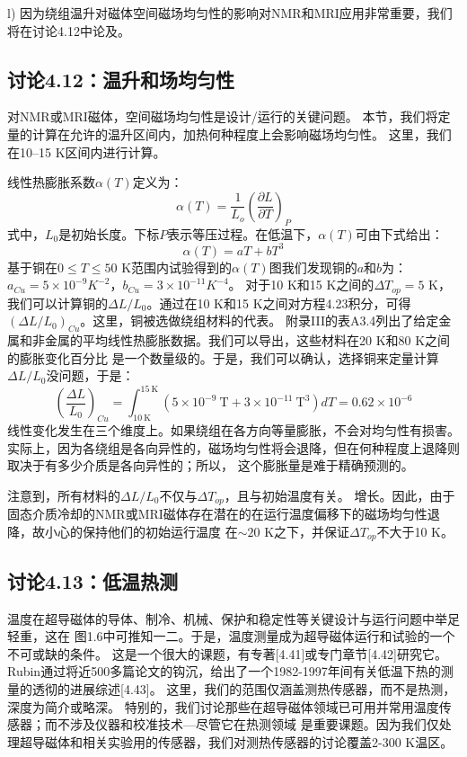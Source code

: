 l) 因为绕组温升对磁体空间磁场均匀性的影响对NMR和MRI应用非常重要，我们将在讨论4.12中论及。



\subsection{讨论4.12：温升和场均匀性}
对NMR或MRI磁体，空间磁场均匀性是设计/运行的关键问题。
本节，我们将定量的计算在允许的温升区间内，加热何种程度上会影响磁场均匀性。
这里，我们在10–15 K区间内进行计算。

线性热膨胀系数$\alpha(T)$定义为：
\begin{equation}%
\alpha(T)=\frac{1}{L_o}\left(\frac{\partial L}{\partial T}\right)_P
\end{equation}
式中，$L_0$是初始长度。下标$P$表示等压过程。在低温下，$\alpha(T)$可由下式给出：
\begin{equation}%
\alpha(T)=aT+bT^3
\end{equation}
基于铜在$0\le T\le 50$ K范围内试验得到的$\alpha(T)$图我们发现铜的$a$和$b$为：
$a_{Cu}= 5\times 10^{-9} K^{−2}$，$b_{Cu} = 3\times 10^{−11} K^{−4}$。
对于10 K和15 K之间的$\Delta T_{op} = 5$ K，我们可以计算铜的$\Delta L/L_0$。通过在10 K和15 K之间对方程4.23积分，可得
$(\Delta L/L_0)_{Cu}$。这里，铜被选做绕组材料的代表。
附录III的表A3.4列出了给定金属和非金属的平均线性热膨胀数据。我们可以导出，这些材料在20 K和80 K之间的膨胀变化百分比
是一个数量级的。于是，我们可以确认，选择铜来定量计算$\Delta L/L_0$没问题，于是：
\begin{equation}%
\left(\frac{\Delta L}{L_0}\right)_{Cu}=\int_{10\ \mathrm{K}}^{15\ \mathrm{K}}(5\times 10^{-9}\ \mathrm{T}+3\times 10^{-11}\ \mathrm{T^3})dT=0.62\times 10^{-6}
\end{equation}
线性变化发生在三个维度上。如果绕组在各方向等量膨胀，不会对均匀性有损害。
实际上，因为各绕组是各向异性的，磁场均匀性将会退降，但在何种程度上退降则取决于有多少介质是各向异性的；所以，
这个膨胀量是难于精确预测的。

注意到，所有材料的$\Delta L/L_0$不仅与$\Delta T_{op}$，且与初始温度有关。
增长。因此，由于固态介质冷却的NMR或MRI磁体存在潜在的在运行温度偏移下的磁场均匀性退降，故小心的保持他们的初始运行温度
在$\sim 20$ K之下，并保证$\Delta T_{op}$不大于10 K。

\subsection{讨论4.13：低温热测}
温度在超导磁体的导体、制冷、机械、保护和稳定性等关键设计与运行问题中举足轻重，这在
图1.6中可推知一二。于是，温度测量成为超导磁体运行和试验的一个不可或缺的条件。
这是一个很大的课题，有专著[4.41]或专门章节[4.42]研究它。
Rubin通过将近500多篇论文的钩沉，给出了一个1982-1997年间有关低温下热的测量的透彻的进展综述[4.43]。
这里，我们的范围仅涵盖测热传感器，而不是热测，深度为简介或略深。
特别的，我们讨论那些在超导磁体领域已可用并常用温度传感器；而不涉及仪器和校准技术---尽管它在热测领域
是重要课题。因为我们仅处理超导磁体和相关实验用的传感器，我们对测热传感器的讨论覆盖2-300 K温区。

